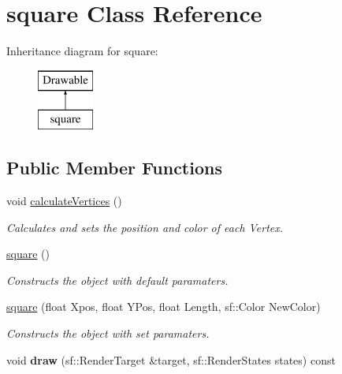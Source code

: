 \hypertarget{classsquare}{}\section{square Class Reference}
\label{classsquare}
Inheritance diagram for square\+:\begin{figure}[H]
\begin{center}
\leavevmode
\includegraphics[height=2.000000cm]{classsquare}
\end{center}
\end{figure}
\subsection*{Public Member Functions}
\begin{DoxyCompactItemize}
\item 
\mbox{\label{classsquare_a1d4d65c833348a55ad24eddaa8bcd098}} 
void \mbox{\hyperlink{classsquare_a1d4d65c833348a55ad24eddaa8bcd098}{calculate\+Vertices}} ()
\begin{DoxyCompactList}\small\item\em Calculates and sets the position and color of each Vertex. \end{DoxyCompactList}\item 
\mbox{\label{classsquare_ab244ecd9e1c5f467c2fa889d25d01766}} 
\mbox{\hyperlink{classsquare_ab244ecd9e1c5f467c2fa889d25d01766}{square}} ()
\begin{DoxyCompactList}\small\item\em Constructs the object with default paramaters. \end{DoxyCompactList}\item 
\mbox{\hyperlink{classsquare_acd85b37d46decbe33655616837fd3972}{square}} (float Xpos, float Y\+Pos, float Length, sf\+::\+Color New\+Color)
\begin{DoxyCompactList}\small\item\em Constructs the object with set paramaters. \end{DoxyCompactList}\item 
\mbox{\label{classsquare_a40bed2f326f5bf227e8efec61454eb4d}} 
void {\bfseries draw} (sf\+::\+Render\+Target \&target, sf\+::\+Render\+States states) const
\end{DoxyCompactItemize}


